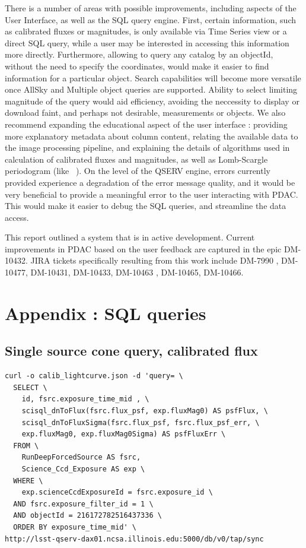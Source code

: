 \documentclass[DM,lsstdraft,toc,usenatbib]{lsstdoc}
\begin{document}
There is a number of areas with possible improvements,  including aspects of the User Interface, as well as the SQL query engine. First, certain information, such as calibrated fluxes or magnitudes, is only available via Time Series view or a direct SQL query, while a user may be interested in accessing this information more directly.  Furthermore, allowing to query any catalog by an objectId, without the need to specify the coordinates, would make it easier to find information for a particular object.  Search capabilities will become more versatile once AllSky and Multiple object queries are supported.  Ability to select limiting magnitude of the query would aid efficiency, avoiding the neccessity to display or download faint, and perhaps not desirable, measurements or objects.  We also recommend expanding the educational aspect of the user interface  : providing more explanatory metadata about column content, relating the available data to the image processing pipeline, and explaining the details of algorithms used in calculation of calibrated fluxes and magnitudes, as well as Lomb-Scargle periodogram (like ~\cite{vanderplas2017}). On the level of the QSERV engine,  errors currently provided  experience a degradation of the error message quality, and it would be very beneficial to provide a meaningful error to the user interacting with PDAC. This would make it easier to debug the SQL queries, and streamline the data access. 

This report outlined a system that is in active development. Current improvements in PDAC based on the user feedback are captured in the epic DM-10432. JIRA tickets specifically resulting from this work include DM-7990 , DM-10477, DM-10431, DM-10433, DM-10463 , DM-10465, DM-10466.

\appendix
\section{Appendix : SQL queries}

\subsection{Single source cone query, calibrated flux}
\label{sec:sql_single_flux}
\begin{lstlisting}
curl -o calib_lightcurve.json -d 'query= \
  SELECT \
    id, fsrc.exposure_time_mid , \
    scisql_dnToFlux(fsrc.flux_psf, exp.fluxMag0) AS psfFlux, \
    scisql_dnToFluxSigma(fsrc.flux_psf, fsrc.flux_psf_err, \
    exp.fluxMag0, exp.fluxMag0Sigma) AS psfFluxErr \
  FROM \
    RunDeepForcedSource AS fsrc, 
    Science_Ccd_Exposure AS exp \
  WHERE \
    exp.scienceCcdExposureId = fsrc.exposure_id \
  AND fsrc.exposure_filter_id = 1 \
  AND objectId = 216172782516437336 \
  ORDER BY exposure_time_mid' \
http://lsst-qserv-dax01.ncsa.illinois.edu:5000/db/v0/tap/sync
\end{lstlisting}
\end{document}
